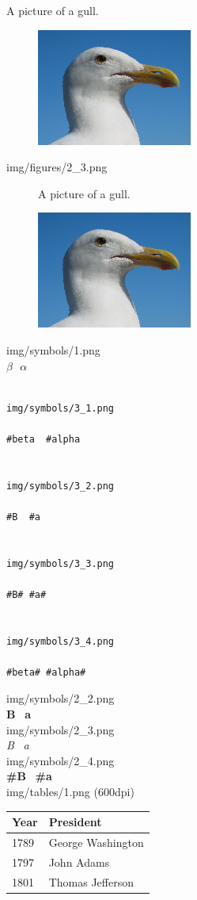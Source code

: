 \documentclass[14pt]{article}
\begin{document}
A picture of a gull.
\begin{figure}[H]
\includegraphics[scale=1]{../../img/gull.png}
\end{figure}
\newpage
\noindent
img/figures/2\_3.png\\[.5cm]
\begin{figure}[H]
\begin{center}
\fontsize{14}{14}\selectfont
A picture of a gull.\\
\setlength{\itemsep}{12pt}
\setlength{\parskip}{12pt}
\setlength{\parsep}{12pt}

\includegraphics[scale=1]{../../img/gull.png}
\end{center}
\end{figure}
\noindent
img/symbols/1.png\\[.5cm]
$\beta\ \ \  \alpha$
\begin{verbatim}

img/symbols/3_1.png

#beta  #alpha


img/symbols/3_2.png

#B  #a


img/symbols/3_3.png

#B# #a#


img/symbols/3_4.png

#beta# #alpha#

\end{verbatim}
\noindent
img/symbols/2\_2.png\\[.5cm]
\textbf{B} \ \textbf{a}\\[.5cm]
img/symbols/2\_3.png\\[.5cm]
\textit{B} \ \textit{a}\\[.5cm]
img/symbols/2\_4.png\\[.5cm]
\textbf{\#B} \ \textbf{\#a}\\[1cm]
img/tables/1.png (600dpi)
\begin{table}[H]
\begin{tabular}{| l | l |}
\hline
Year & President \\
\hline
1789 & George Washington \\
\hline
1797 & John Adams \\
\hline
1801 & Thomas Jefferson \\
\hline
\end{tabular}
\end{table}
\end{document}
